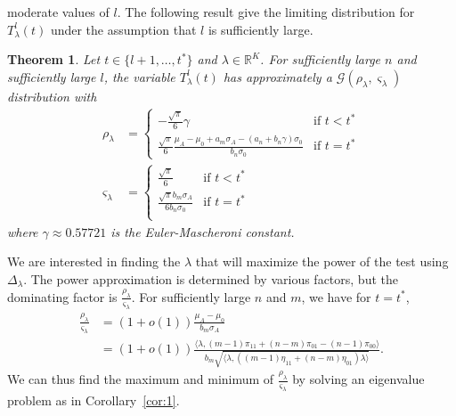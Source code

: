 \documentclass[10pt,journal,compsoc]{IEEEtran}
\newtheorem{theorem}{Theorem}
\theoremstyle{definition}
\begin{document}
moderate values of $l$. The following result give the limiting
distribution for $T_{\lambda}^{l}(t)$ under the assumption that $l$ is
sufficiently large. 
\begin{theorem}
  \label{thm:8}
  Let $t \in \{l+1, \dots, t^{*}\}$ and $\lambda \in
  \mathbb{R}^{K}$. For sufficiently large $n$ and sufficiently large
  $l$, the variable $T_{\lambda}^{l}(t)$ has approximately a
  $\mathcal{G}(\rho_{\lambda}, \varsigma_{\lambda})$ distribution with
\begin{align}
  \label{eq:13}
  \rho_{\lambda} &= \begin{cases}
      - \frac{ \sqrt{\pi}}{6} \gamma & \text{if $t < t^{*}$} \\
    \frac{\sqrt{\pi}}{6} \frac{\mu_A - \mu_0 + a_m\sigma_A - (a_n + b_n
      \gamma)\sigma_0}{b_n \sigma_0} & \text{if $t =
        t^{*}$} 
  \end{cases}\\
  \varsigma_{\lambda} &= \begin{cases}
    \frac{\sqrt{\pi}}{6} & \text{if $t < t^{*}$} \\
    \frac{\sqrt{\pi} b_m \sigma_A}{6 b_n \sigma_0} & \text{if $t =
      t^{*}$} \\
    \end{cases}
\end{align}
where $\gamma \approx 0.57721$ is the Euler-Mascheroni constant.
\end{theorem}
We are interested in finding the $\lambda$ that will maximize the
power of the test using $\Delta_{\lambda}$. The power approximation is
determined by various factors, but the dominating factor is
$\tfrac{\rho_\lambda}{\varsigma_\lambda}$. For sufficiently large $n$
and $m$, we have for $t = t^{*}$,
\begin{equation*}
  \begin{split}
  \frac{\rho_\lambda}{\varsigma_\lambda} &= (1 + o(1)) \frac{\mu_A - \mu_0}{b_m
    \sigma_A} \\ &= (1 + o(1)) \frac{\langle \lambda, (m-1)\pi_{11} + (n-m)\pi_{01} -
    (n-1) \pi_{00} \rangle}{b_m \sqrt{\langle \lambda, ((m-1) \eta_{11} +
    (n-m)\eta_{01}) \lambda \rangle}}.
  \end{split}
\end{equation*}
We can thus find the maximum and minimum of
$\tfrac{\rho_{\lambda}}{\varsigma_{\lambda}}$ by solving an 
eigenvalue problem as in Corollary~\ref{cor:1}.
\end{document}
